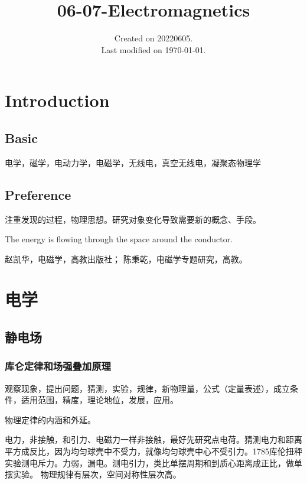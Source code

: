 \documentclass[UTF8]{../06-Physics}
\begin{document}
\title{06-07-Electromagnetics}
\date{Created on 20220605.\\   Last modified on \today.}
\maketitle
\tableofcontents





\chapter{Introduction}


\section{Basic}

电学，磁学，电动力学，电磁学，无线电，真空无线电，凝聚态物理学


\section{Preference}
注重发现的过程，物理思想。研究对象变化导致需要新的概念、手段。

The energy is flowing through the space around the conductor.

赵凯华，电磁学，高教出版社；
陈秉乾，电磁学专题研究，高教。












\chapter{电学}

\section{静电场}

\subsection{库仑定律和场强叠加原理}

观察现象，提出问题，猜测，实验，规律，新物理量，公式（定量表述），成立条件，适用范围，精度，理论地位，发展，应用。 

物理定律的内涵和外延。

电力，非接触，和引力、电磁力一样非接触，最好先研究点电荷。猜测电力和距离平方成反比，因为均匀球壳中不受力，就像均匀球壳中心不受引力。1785库伦扭秤实验测电斥力。力弱，漏电。测电引力，类比单摆周期和到质心距离成正比，做单摆实验。
物理规律有层次，空间对称性层次高。
\end{document}
